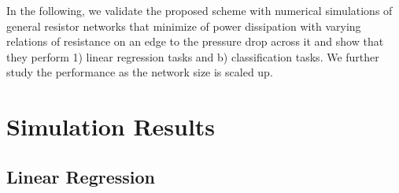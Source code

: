 \documentclass[%
 reprint,
 amsmath,amssymb,
 aps,
]{revtex4-2}
\begin{document}
    
    In the following, we validate the proposed scheme with numerical simulations of general resistor networks that minimize of power dissipation with varying relations of resistance on an edge to the pressure drop across it and show that they perform 1) linear regression tasks and b) classification tasks. We further study the performance as the network size is scaled up.

\section{Simulation Results}\label{sec:results}

\subsection{Linear Regression}\label{sec:linear_regression}

    
    
\end{document}
